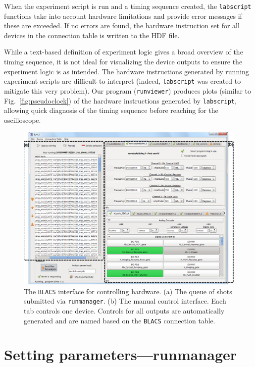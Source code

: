 When the experiment script is run and a timing sequence created, the \texttt{labscript} functions take into account hardware limitations and provide error messages if these are exceeded.
If no errors are found, the hardware instruction set for all devices in the connection table is written to the HDF file.

While a text-based definition of experiment logic gives a broad overview of the timing sequence, it is not ideal for visualizing the device outputs to ensure the experiment logic is as intended.
The hardware instructions generated by running experiment scripts are difficult to interpret (indeed, \texttt{labscript} was created to mitigate this very problem).
Our program (\texttt{runviewer}) produces plots (similar to Fig.~\ref{fig:pseudoclock}) of the hardware instructions generated by \texttt{labscript}, allowing quick diagnosis of the timing sequence before reaching for the oscilloscope.


\begin{figure}%
\includegraphics{figures/software/BLACS.eps}%
\caption{
The \texttt{BLACS} interface for controlling hardware.
(a) The queue of shots submitted via \texttt{runmanager}.
(b) The manual control interface.
Each tab controls one device.
Controls for all outputs are automatically generated and are named based on the \texttt{BLACS} connection table.
}%
\label{fig:BLACS}%
\end{figure}


\section{Setting parameters---runmanager}\label{runmanager}

